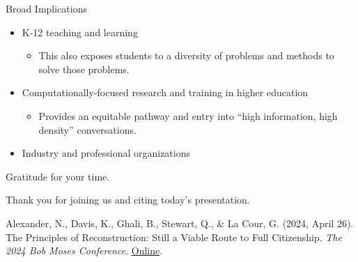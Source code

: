 \documentclass[
  ignorenonframetext,
]{beamer}
\providecommand{\tightlist}{%
  \setlength{\itemsep}{0pt}\setlength{\parskip}{0pt}}
\begin{document}
\begin{frame}{Broad Implications}
\protect\hypertarget{broad-implications}{}
\begin{itemize}
\item
  K-12 teaching and learning

  \begin{itemize}
  \tightlist
  \item
    This also exposes students to a diversity of problems and methods to
    solve those problems.
  \end{itemize}
\item
  Computationally-focused research and training in higher education

  \begin{itemize}
  \tightlist
  \item
    Provides an equitable pathway and entry into ``high information,
    high density'' conversations.
  \end{itemize}
\item
  Industry and professional organizations
\end{itemize}
\end{frame}

\begin{frame}{Gratitude for your time.}
\protect\hypertarget{gratitude-for-your-time.}{}
\pause

Thank you for joining us and citing today's presentation.

Alexander, N., Davis, K., Ghali, B., Stewart, Q., \& La Cour, G. (2024,
April 26). The Principles of Reconstruction: Still a Viable Route to
Full Citizenship. \emph{The 2024 Bob Moses Conference}.
\href{https://www.bobmosesconference.com/}{Online}.
\end{frame}
\end{document}
